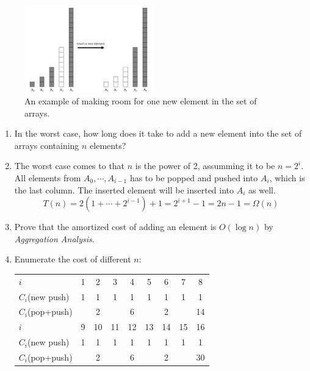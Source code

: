 \documentclass[12pt,a4paper]{article}
\makeatletter
\newtheorem*{solution}{Solution}
\theoremstyle{definition}
\renewenvironment{solution}[1][Solution] {\par\pushQED{\qed}\normalfont\topsep6\p@\@plus6\p@\relax\trivlist\item[\hskip\labelsep\bfseries#1\@addpunct{.}]\ignorespaces}{\popQED\endtrivlist\@endpefalse} \makeatother
\makeatother
\begin{document}
\begin{enumerate}
	\begin{figure}[!htbp]
	\centering
	\includegraphics[width=0.5\textwidth]{Fig-MultiArray.pdf}
	\caption{An example of making room for one new element in the set of arrays.}
	\label{Fig-MultiArray}
	\end{figure}

    \begin{enumerate}
        \item In the worst case, how long does it take to add a new element into the set of arrays containing $n$ elements?
        \begin{solution}
			The worst case comes to that $n$ is the power of 2, assumming it to be $n=2^i$. All elements from $A_0, \cdots, A_{i-1}$ has to be popped and pushed into $A_i$, which is the last column. The inserted element will be inserted into $A_i$ as well.
			\begin{equation*}
				T(n) = 2(1+\cdots + 2^{i-1})+1 = 2^{i+1}-1 = 2n-1 = \Omega(n)
			\end{equation*}
		\end{solution}
        \item Prove that the amortized cost of adding an element is $O(\log n)$ by \emph{Aggregation Analysis}.
        \begin{solution}
			Enumerate the cost of different $n$:

			\begin{table}[h]
				\centering
				\begin{tabular}{l|cccccccc}
					\hline
					$i$ 			& 1 & 2 & 3 & 4 & 5 & 6 & 7 & 8 \\
					$C_i$(new push) 	& 1 & 1 & 1 & 1 & 1 & 1 & 1 & 1 \\
					$C_i$(pop+push)	&   & 2 &   & 6 &   & 2 &   & 14\\
					\hline
					$i$ 			& 9 & 10& 11& 12& 13& 14& 15& 16\\
					$C_i$(new push) 	& 1 & 1 & 1 & 1 & 1 & 1 & 1 & 1 \\
					$C_i$(pop+push)	&   & 2 &   & 6 &   & 2 &   & 30\\
					\hline
				\end{tabular}
			\end{table}


\end{solution}
\end{enumerate}
\end{enumerate}
\end{document}
